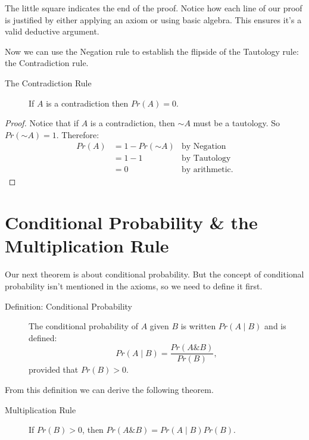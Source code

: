 \documentclass[justified]{tufte-book}
\newcommand{\given}{\mid}
\renewcommand{\neg}{\mathbin{\sim}}
\renewcommand{\wedge}{\mathbin{\&}}
\newcommand{\p}{Pr}
\theoremstyle{definition}
\theoremstyle{definition}
\theoremstyle{definition}
\theoremstyle{definition}
\theoremstyle{remark}
\begin{document}
The little square indicates the end of the proof. Notice how each line of our proof is justified by either applying an axiom or using basic algebra. This ensures it's a valid deductive argument.

Now we can use the Negation rule to establish the flipside of the Tautology rule: the Contradiction rule.

\begin{description}
\item[The Contradiction Rule]
If \(A\) is a contradiction then \(\p(A) = 0\).
\end{description}

\begin{proof}
{}
Notice that if \(A\) is a contradiction, then \(\neg A\) must be a tautology. So \(\p(\neg A) = 1\). Therefore:
\[
  \begin{aligned}
  \p(A) &= 1 - \p(\neg A) & \mbox{by Negation}\\
        &= 1 - 1          & \mbox{by Tautology}\\
        &= 0              & \mbox{by arithmetic.}
  \end{aligned}
\]
\end{proof}

\hypertarget{conditional-probability-the-multiplication-rule}{%
\section*{Conditional Probability \& the Multiplication Rule}\label{conditional-probability-the-multiplication-rule}}

Our next theorem is about conditional probability. But the concept of conditional probability isn't mentioned in the axioms, so we need to define it first.

\begin{description}
\item[Definition: Conditional Probability]
The conditional probability of \(A\) given \(B\) is written \(\p(A \given B)\) and is defined: \[\p(A \given B) = \frac{\p(A \wedge B)}{\p(B)},\] provided that \(\p(B) > 0\).
\end{description}

From this definition we can derive the following theorem.

\begin{description}
\item[Multiplication Rule]
If \(\p(B) > 0\), then \(\p(A \wedge B) = \p(A \given B)\p(B)\).
\end{description}
\end{document}
